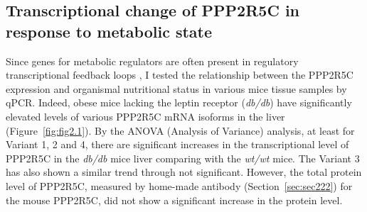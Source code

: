 \subsection{Transcriptional change of PPP2R5C in response to metabolic state}

Since genes for metabolic regulators are often present in regulatory transcriptional feedback loops \cite{amemiya-kudo_promoter_2000}, I tested the relationship between the PPP2R5C expression and organismal nutritional status in various mice tissue samples by qPCR. Indeed, obese mice lacking the leptin receptor (\textit{db/db}) have significantly elevated levels of various PPP2R5C mRNA isoforms in the liver (Figure~\ref{fig:fig2.1}). By the \gls{ANOVA} (Analysis of Variance) analysis, at least for Variant 1, 2 and 4, there are significant increases in the transcriptional level of PPP2R5C in the \textit{db/db} mice liver comparing with the \textit{wt/wt} mice. The Variant 3 has also shown a similar trend through not significant. However, the total protein level of PPP2R5C, measured by home-made antibody (Section~\ref{sec:sec222}) for the mouse PPP2R5C, did not show a significant increase in the protein level. %

